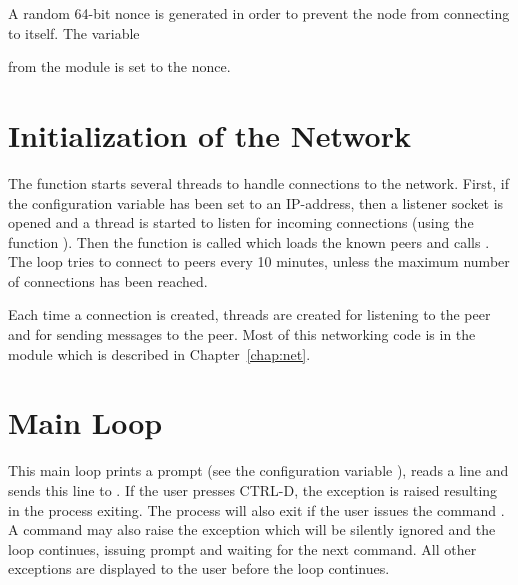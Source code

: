 A random 64-bit nonce is generated in order to prevent
the node from connecting to itself.
The variable { from the {} module
is set to the nonce.

\section{Initialization of the Network}\label{sec:initnetwork}

The {} function starts several threads to
handle connections to the network.
First, if the configuration variable {}
has been set to an IP-address, then
a listener socket is opened and a thread
is started to listen for incoming connections (using
the function {}).
Then the function {} is called which
loads the known peers
and calls {}.
The loop tries to connect to peers
every 10 minutes, unless the maximum number of connections has been reached.

Each time a connection is created, threads are created for 
listening to the peer and for sending messages to the peer.
Most of this networking code is in the {} module
which is described in Chapter~\ref{chap:net}.

\section{Main Loop}\label{sec:mainloop}

This main loop prints a prompt (see the configuration variable {}),
reads a line and sends this line to {}.
If the user presses CTRL-D, the {} exception is raised
resulting in the process exiting.
The process will also exit if the user issues the command {}.
A command may also raise the exception {} which will be silently ignored
and the loop continues, issuing prompt and waiting for the next command.
All other exceptions are displayed to the user before the loop continues.

}
